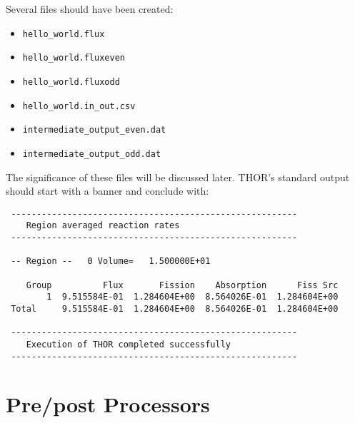 Several files should have been created: 
\begin{itemize}
    \item \verb"hello_world.flux"
    \item \verb"hello_world.fluxeven"
    \item \verb"hello_world.fluxodd"
    \item \verb"hello_world.in_out.csv"
    \item \verb"intermediate_output_even.dat" \item \verb"intermediate_output_odd.dat"
\end{itemize}
The significance of these files will be discussed later.
THOR's standard output should start with a banner and conclude with:
\begin{verbatim}
 --------------------------------------------------------
    Region averaged reaction rates  
 --------------------------------------------------------

 -- Region --   0 Volume=   1.500000E+01

    Group          Flux       Fission    Absorption      Fiss Src
        1  9.515584E-01  1.284604E+00  8.564026E-01  1.284604E+00
 Total     9.515584E-01  1.284604E+00  8.564026E-01  1.284604E+00

 --------------------------------------------------------
    Execution of THOR completed successfully  
 --------------------------------------------------------
\end{verbatim}

\section{Pre/post Processors}

